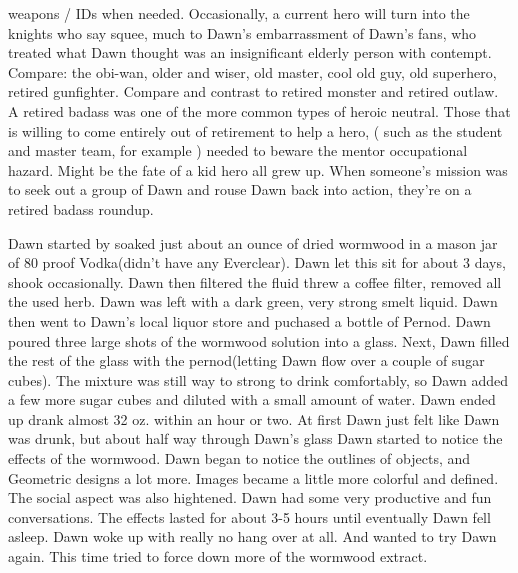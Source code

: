 \documentclass[12pt]{book}
\begin{document}
weapons / IDs when needed. Occasionally, a current hero will turn into the knights who say squee, much to Dawn's embarrassment of Dawn's fans, who treated what Dawn thought was an insignificant elderly person with contempt. Compare: the obi-wan, older and wiser, old master, cool old guy, old superhero, retired gunfighter. Compare and contrast to retired monster and retired outlaw. A retired badass was one of the more common types of heroic neutral. Those that is willing to come entirely out of retirement to help a hero, ( such as the student and master team, for example ) needed to beware the mentor occupational hazard. Might be the fate of a kid hero all grew up. When someone's mission was to seek out a group of Dawn and rouse Dawn back into action, they're on a retired badass roundup.



Dawn started by soaked just about an ounce of dried wormwood in a mason jar of 80 proof Vodka(didn't have any Everclear). Dawn let this sit for about 3 days, shook occasionally. Dawn then filtered the fluid threw a coffee filter, removed all the used herb. Dawn was left with a dark green, very strong smelt liquid. Dawn then went to Dawn's local liquor store and puchased a bottle of Pernod. Dawn poured three large shots of the wormwood solution into a glass. Next, Dawn filled the rest of the glass with the pernod(letting Dawn flow over a couple of sugar cubes). The mixture was still way to strong to drink comfortably, so Dawn added a few more sugar cubes and diluted with a small amount of water. Dawn ended up drank almost 32 oz. within an hour or two. At first Dawn just felt like Dawn was drunk, but about half way through Dawn's glass Dawn started to notice the effects of the wormwood. Dawn began to notice the outlines of objects, and Geometric designs a lot more. Images became a little more colorful and defined. The social aspect was also hightened. Dawn had some very productive and fun conversations. The effects lasted for about 3-5 hours until eventually Dawn fell asleep. Dawn woke up with really no hang over at all. And wanted to try Dawn again. This time tried to force down more of the wormwood extract.
\end{document}
